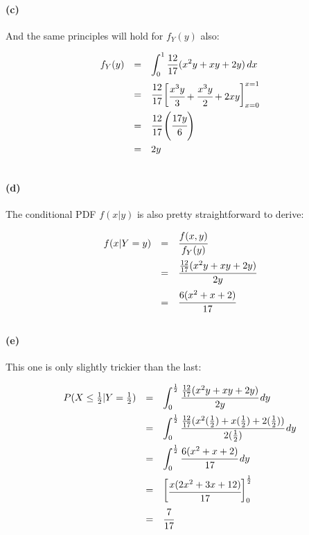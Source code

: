 \documentclass[a4paper]{article}
\begin{document}
\paragraph{(c)} And the same principles will hold for $f_{Y}(y)$ also:

\begin{equation}
\begin{array}{rcl}
f_{Y}(y) & = & \displaystyle\int^{1}_{0} \frac{12}{17} (x^2y + xy + 2y) \,dx \\[.15in]
& = & \cfrac{12}{17} \begin{bmatrix} \cfrac{x^3y}{3} + \cfrac{x^3y}{2} + 2xy \end{bmatrix}^{x = 1}_{x = 0} \\[.15in]
& = & \cfrac{12}{17} \left( \cfrac{17y}{6} \right) \\[.17in]
& = & 2y \\[.15in]
\end{array}
\end{equation}

\paragraph{(d)} The conditional PDF $f(x|y)$ is also pretty straightforward to derive:

\begin{equation}
\begin{array}{rcl}
f(x | Y=y) & = & \cfrac{f(x, y)}{f_{Y}(y)} \\[.15in]
& = & \cfrac{\frac{12}{17} (x^2y + xy + 2y)}{2y} \\[.15in]
& = & \cfrac{6 (x^2 + x + 2)}{17} \\[.15in]
\end{array}
\end{equation}

\paragraph{(e)} This one is only slightly trickier than the last:

\begin{equation}
\begin{array}{rcl}
P(X \le \frac{1}{2} | Y = \frac{1}{2}) & = & \displaystyle\int^{\frac{1}{2}}_{0} \cfrac{\frac{12}{17} (x^2y + xy + 2y)}{2y} \,dy \\[.15in]
& = & \displaystyle\int^{\frac{1}{2}}_{0} \cfrac{\frac{12}{17} (x^2(\frac{1}{2}) + x(\frac{1}{2}) + 2(\frac{1}{2}))}{2(\frac{1}{2})} \,dy \\[.15in]
& = & \displaystyle\int^{\frac{1}{2}}_{0} \cfrac{6 (x^2 + x + 2)}{17} \,dy \\[.15in]
& = & \begin{bmatrix} \cfrac{x (2x^2 + 3x + 12)}{17} \end{bmatrix}^{\frac{1}{2}}_{0} \\[.15in]
& = & \cfrac{7}{17} \\[.15in]
\end{array}
\end{equation}
\end{document}

